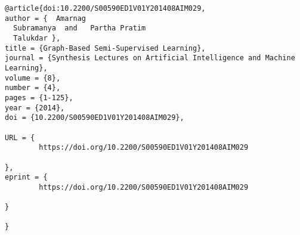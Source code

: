 \documentclass{article}
\begin{document}
\begin{verbatim}
@article{doi:10.2200/S00590ED1V01Y201408AIM029,
author = {  Amarnag 
  Subramanya  and   Partha Pratim 
  Talukdar },
title = {Graph-Based Semi-Supervised Learning},
journal = {Synthesis Lectures on Artificial Intelligence and Machine Learning},
volume = {8},
number = {4},
pages = {1-125},
year = {2014},
doi = {10.2200/S00590ED1V01Y201408AIM029},

URL = { 
        https://doi.org/10.2200/S00590ED1V01Y201408AIM029
    
},
eprint = { 
        https://doi.org/10.2200/S00590ED1V01Y201408AIM029
    
}

}
\end{verbatim}
\end{document}
